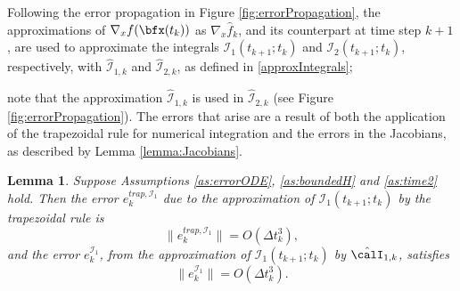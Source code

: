 \documentclass[DIV=12]{scrartcl} %
\newcommand{\err}{\ensuremath{e}}
\newtheorem{lemma}{Lemma}
\theoremstyle{definition}
\begin{document}
Following the error propagation in Figure \ref{fig:errorPropagation}, the approximations of $\nabla_xf(\bfx(t_k))$ as $\nabla_x\hat{f}_k$, and its counterpart at time step $k+1$, are used to approximate the integrals $\mathcal{I}_1(t_{k+1};t_k)$ and $\mathcal{I}_2(t_{k+1};t_k)$, respectively, with $\hat{\mathcal{I}}_{1,k}$ and $\hat{\mathcal{I}}_{2,k}$, as defined in \eqref{approxIntegrals}; 

note that the approximation $\hat{\mathcal{I}}_{1,k}$ is used in $\hat{\mathcal{I}}_{2,k}$ (see Figure \ref{fig:errorPropagation}). The errors that arise are a result of both the application of the trapezoidal rule for numerical integration and the errors in the Jacobians, as described by Lemma \ref{lemma:Jacobians}. 
\begin{lemma}
\label{lemma:errI1}
Suppose Assumptions \ref{as:errorODE}, \ref{as:boundedH} and \ref{as:time2} hold. Then the error $\err_k^{trap,\mathcal{I}_1}$ due to the approximation of $\mathcal{I}_1(t_{k+1};t_k)$ by the trapezoidal rule is
\begin{equation}
    \label{errTrapOrder}
    \|\err_k^{trap,\mathcal{I}_1}\|=O(\Delta t_k^3),
\end{equation}
and the error $\err_k^{\mathcal{I}_{1}}$, from the approximation of $\mathcal{I}_1(t_{k+1};t_k)$ by $\hat{\calI}_{1,k}$, satisfies
\begin{equation}
    \label{errI1Order}
    \|\err_k^{\mathcal{I}_{1}}\|=O(\Delta t_k^3).
\end{equation}
\end{lemma}
\end{document}
